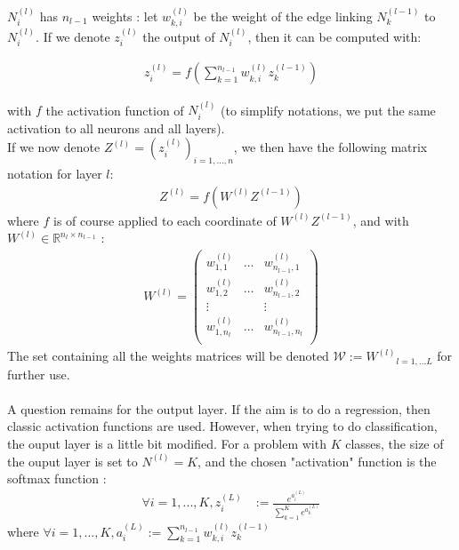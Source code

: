 \documentclass{article}
\newcommand{\R}{\mathbb R}
\begin{document}
\noindent $N_i^{(l)}$ has $n_{l-1}$ weights : let $w_{k, i}^{(l)}$ be the weight of the edge linking 
$N_{k}^{(l-1)}$ to $N_i^{(l)}$.
 If we denote $z_i^{(l)}$ the output of $N_i^{(l)}$, then it can be computed with:

\begin{align*}
    z_i^{(l)} = f \left ( \sum_{k=1}^{n_{l-1}} w_{k, i}^{(l)} z_{k}^{(l-1)} \right )
\end{align*}

\noindent with $f$ the activation function of $N_i^{(l)}$ (to simplify notations, we put the same activation to all
neurons and all layers). \\

\noindent If we now denote $Z^{(l)} = (z_i^{(l)})_{i=1, ..., n}$, we then have the following matrix notation
for layer $l$:
\begin{align*}
    Z^{(l)} = f \left ( W^{(l)} Z^{(l-1)} \right )
\end{align*}
\noindent where $f$ is of course applied to each coordinate of $W^{(l)} Z^{(l-1)}$,
 and with $W^{(l)} \in \R^{n_{l}\times n_{l-1}}  $ : 
\begin{align*}
    W^{(l)} = 
    \left (
    \begin{array}{ccc}
        w_{1, 1}^{(l)} & \hdots & w_{n_{l-1}, 1}^{(l)} \\
        w_{1, 2}^{(l)} & \hdots & w_{n_{l-1}, 2}^{(l)} \\
        \vdots & & \vdots \\
        w_{1, n_l}^{(l)} & \hdots & w_{n_{l-1}, n_l}^{(l)} \\
    \end{array}
    \right )
\end{align*}
The set containing all the weights matrices will be denoted $\mathcal{W} := {W^{(l)}}_{l=1, ...L}$ for further use.\\ \\


A question remains for the output layer. If the aim is to do a regression, then classic 
activation functions are used. However, when trying to do classification, the ouput layer
is a little bit modified. For a problem with $K$ classes, the size of the ouput layer is 
set to $N^{(l)} = K$, and the chosen "activation" function is the softmax function : 
\begin{align*}
    \forall i = 1, ..., K , z_{i}^{(L)} &:= \frac{e^{a_i^{(L)}}}{\sum_{k=1}^{K} e^{a_k^{(L)}}}
\end{align*}
where $\forall i = 1, ..., K, a_i^{(L)} :=  \sum_{k=1}^{n_{l-1}} w_{k, i}^{(l)} z_{k}^{(l-1)}$
\end{document}
